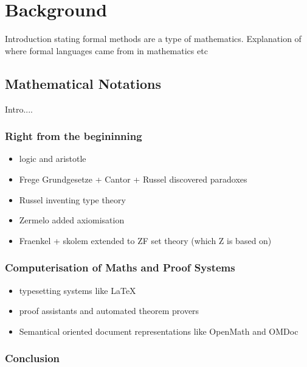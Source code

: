 \chapter{Background}
\label{ch:background}

Introduction stating formal methods are a type of mathematics. Explanation of where formal languages came from in mathematics etc

\section{Mathematical Notations}

Intro....

\subsection{Right from the begininning}

\begin{itemize}
\item logic and aristotle

\item Frege Grundgesetze + Cantor + Russel discovered paradoxes

\item Russel inventing type theory

\item Zermelo added axiomisation

\item Fraenkel + skolem extended to ZF set theory (which Z is based on)

\end{itemize}

\subsection{Computerisation of Maths and Proof Systems}

\begin{itemize}
\item typesetting systems like \LaTeX{}

\item proof assistants and automated theorem provers

\item Semantical oriented document representations like OpenMath and OMDoc
\end{itemize}


\subsection{Conclusion}

